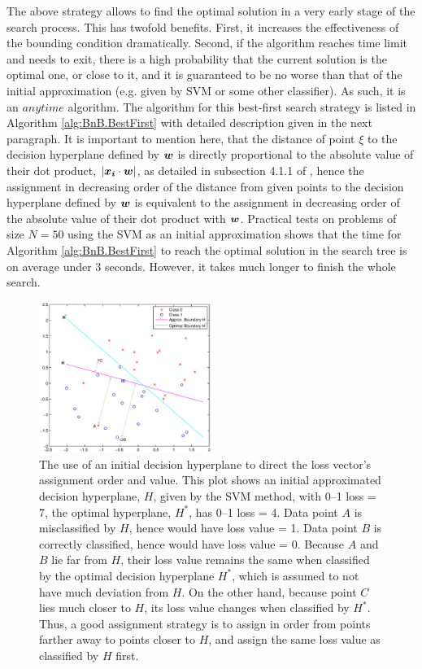 The above strategy allows to find the optimal solution in a very early stage of the search process. This has twofold benefits. First, it increases the effectiveness of the bounding condition dramatically. Second, if the algorithm reaches time limit and needs to exit, there is a high probability that the current solution is the optimal one, or close to it, and it is guaranteed to be no worse than that of the initial approximation (e.g. given by SVM or some other classifier). As such, it is an $anytime$ algorithm. The algorithm for this best-first search strategy is listed in Algorithm \ref{alg:BnB.BestFirst} with detailed description given in the next paragraph. It is important to mention here, that the distance of point $\xi$ to the decision hyperplane defined by $\boldsymbol{w}$ is directly proportional to the absolute value of their dot product, $| \boldsymbol{x_i} \cdot \boldsymbol{w} |$, as detailed in subsection 4.1.1 of \cite{bishop06}, hence the assignment in decreasing order of the distance from given points to the decision hyperplane defined by $\boldsymbol{w}$ is equivalent to the assignment in decreasing order of the absolute value of their dot product with $\boldsymbol{w}$. Practical tests on problems of size $N=50$ using the SVM as an initial approximation shows that the time for Algorithm \ref{alg:BnB.BestFirst} to reach the optimal solution in the search tree is on average under 3 seconds. However, it takes much longer  to finish the whole search.

\begin{figure}[here]
\includegraphics[width=0.50\textwidth]{images/fig31_svmhyperplane.eps}
\caption{
The use of an initial decision hyperplane to direct the loss vector's assignment order and value. 
This plot shows an initial approximated decision hyperplane, $H$, given by the SVM method, with 0--1 loss = 7, the optimal hyperplane, $H^*$, has 0--1 loss = 4. Data point $A$ is misclassified by $H$, hence would have loss value = 1. Data point $B$ is correctly classified, hence would have loss value = 0. Because $A$ and $B$ lie far from $H$, their loss value remains the same when classified by the optimal decision hyperplane $H^*$, which is assumed to not have much deviation from $H$. On the other hand, because point $C$ lies much closer to $H$, its loss value changes when classified by $H^*$. Thus, a good assignment strategy is to assign in order from points farther away to points closer to $H$, and assign the same loss value as classified by $H$ first. 
}
\label{fig:svm_hyperplane}
\end{figure}

